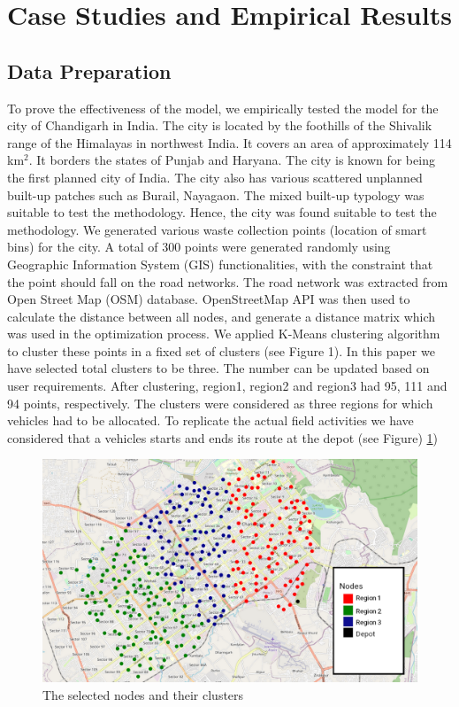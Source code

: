 \documentclass[12pt]{article}
\begin{document}
\section{Case Studies and Empirical Results}

\subsection{Data Preparation}

To prove the effectiveness of the model, we empirically tested the model for the city of Chandigarh in India. The city is located by the foothills of the Shivalik range of the Himalayas in northwest India. It covers an area of approximately 114 km$^2$. It borders the states of Punjab and Haryana. The city is known for being the first planned city of India. The city also has various scattered unplanned built-up patches such as Burail, Nayagaon. The mixed built-up typology was suitable to test the methodology. Hence, the city was found suitable to test the methodology. We generated various waste collection points (location of smart bins) for the city. A total of 300 points were generated randomly using Geographic Information System (GIS) functionalities, with the constraint that the point should fall on the road networks. The road network was extracted from Open Street Map (OSM) database. OpenStreetMap API was then used to calculate the distance between all nodes, and generate a distance matrix which was used in the optimization process. We applied K-Means clustering algorithm to cluster these points in a fixed set of clusters (see Figure 1). In this paper we have selected total clusters to be three. The number can be updated based on user requirements. After clustering, region1, region2 and region3 had 95, 111 and 94 points, respectively. The clusters were considered as three regions for which vehicles had to be allocated. To replicate the actual field activities we have considered that a vehicles starts and ends its route at the depot (see Figure) \ref{figm})


\begin{figure}[H]
    \centering
    \includegraphics[scale=0.4]{Nodes.png}
    \caption{The selected nodes and their clusters}\label{figm}
\end{figure}
\end{document}
